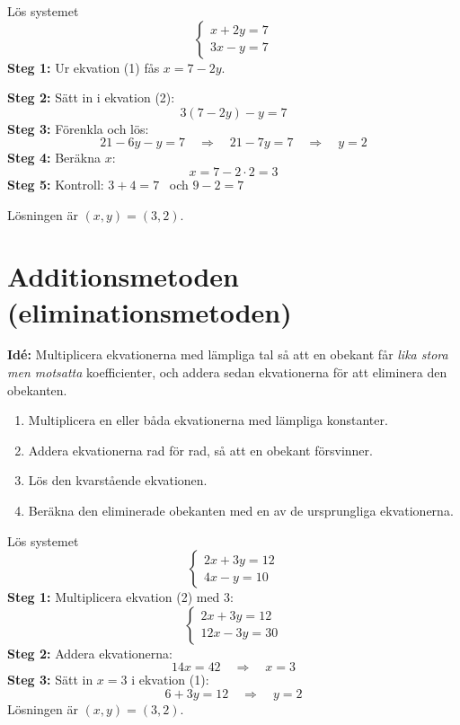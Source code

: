 \begin{exempel}
Lös systemet
\[
  \begin{cases}
    x + 2y = 7 \\
    3x - y = 7
  \end{cases}
\]
\textbf{Steg 1:} Ur ekvation (1) fås $x = 7 - 2y$.
\par\noindent\textbf{Steg 2:} Sätt in i ekvation (2):
\[
  3(7 - 2y) - y = 7
\]
\textbf{Steg 3:} Förenkla och lös:
\[
  21 - 6y - y = 7 \quad \Rightarrow \quad 21 - 7y = 7 \quad \Rightarrow \quad y = 2
\]
\textbf{Steg 4:} Beräkna $x$:
\[
  x = 7 - 2 \cdot 2 = 3
\]
\textbf{Steg 5:} Kontroll: $3 + 4 = 7$~\checkmark{} och $9 - 2 = 7$~\checkmark
\par\noindent Lösningen är $(x, y) = (3, 2)$.
\end{exempel}

\section{Additionsmetoden (eliminationsmetoden)}
\label{c4:sec:addition}
\textbf{Idé:} Multiplicera ekvationerna med lämpliga tal så att en obekant får \emph{lika stora men
motsatta} koefficienter, och addera sedan ekvationerna för att eliminera den obekanten.
\begin{enumerate}
  \item Multiplicera en eller båda ekvationerna med lämpliga konstanter.
  \item Addera ekvationerna rad för rad, så att en obekant försvinner.
  \item Lös den kvarstående ekvationen.
  \item Beräkna den eliminerade obekanten med en av de ursprungliga ekvationerna.
\end{enumerate}

\begin{exempel}
Lös systemet
\[
  \begin{cases}
    2x + 3y = 12 \\
    4x - y = 10
  \end{cases}
\]
\textbf{Steg 1:} Multiplicera ekvation (2) med $3$:
\[
  \begin{cases}
    2x + 3y = 12 \\
    12x - 3y = 30
  \end{cases}
\]
\textbf{Steg 2:} Addera ekvationerna:
\[
  14x = 42 \quad \Rightarrow \quad x = 3
\]
\textbf{Steg 3:} Sätt in $x = 3$ i ekvation (1):
\[
  6 + 3y = 12 \quad \Rightarrow \quad y = 2
\]
Lösningen är $(x, y) = (3, 2)$.
\end{exempel}

